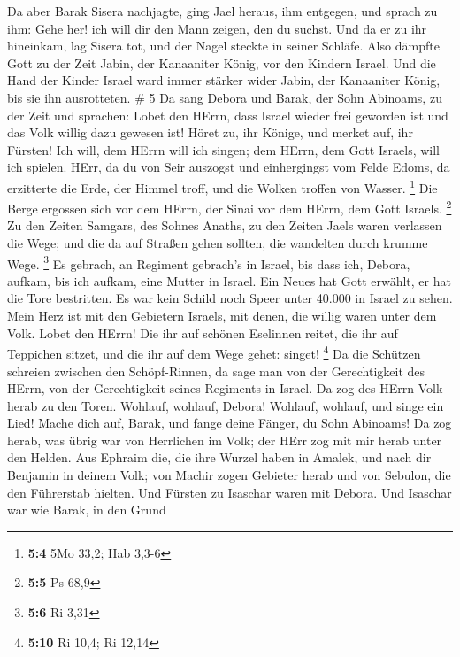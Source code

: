  Da aber Barak Sisera nachjagte, ging Jael heraus, ihm
entgegen, und sprach zu ihm: Gehe her! ich will dir den Mann zeigen, den
du suchst. Und da er zu ihr hineinkam, lag Sisera tot, und der Nagel
steckte in seiner Schläfe.  Also dämpfte Gott zu der Zeit
Jabin, der Kanaaniter König, vor den Kindern Israel.  Und
die Hand der Kinder Israel ward immer stärker wider Jabin, der
Kanaaniter König, bis sie ihn ausrotteten. \# 5  Da sang
Debora und Barak, der Sohn Abinoams, zu der Zeit und sprachen:
 Lobet den HErrn, dass Israel wieder frei geworden ist und
das Volk willig dazu gewesen ist!  Höret zu, ihr Könige, und
merket auf, ihr Fürsten! Ich will, dem HErrn will ich singen; dem HErrn,
dem Gott Israels, will ich spielen.  HErr, da du von Seir
auszogst und einhergingst vom Felde Edoms, da erzitterte die Erde, der
Himmel troff, und die Wolken troffen von Wasser. \footnote{\textbf{5:4}
  5Mo 33,2; Hab 3,3-6}  Die Berge ergossen sich vor dem
HErrn, der Sinai vor dem HErrn, dem Gott Israels. \footnote{\textbf{5:5}
  Ps 68,9}  Zu den Zeiten Samgars, des Sohnes Anaths, zu den
Zeiten Jaels waren verlassen die Wege; und die da auf Straßen gehen
sollten, die wandelten durch krumme Wege. \footnote{\textbf{5:6} Ri 3,31}
 Es gebrach, an Regiment gebrach's in Israel, bis dass ich,
Debora, aufkam, bis ich aufkam, eine Mutter in Israel.  Ein
Neues hat Gott erwählt, er hat die Tore bestritten. Es war kein Schild
noch Speer unter 40.000 in Israel zu sehen.  Mein Herz ist
mit den Gebietern Israels, mit denen, die willig waren unter dem Volk.
Lobet den HErrn!  Die ihr auf schönen Eselinnen reitet, die
ihr auf Teppichen sitzet, und die ihr auf dem Wege gehet: singet!
\footnote{\textbf{5:10} Ri 10,4; Ri 12,14}  Da die Schützen
schreien zwischen den Schöpf-Rinnen, da sage man von der Gerechtigkeit
des HErrn, von der Gerechtigkeit seines Regiments in Israel. Da zog des
HErrn Volk herab zu den Toren.  Wohlauf, wohlauf, Debora!
Wohlauf, wohlauf, und singe ein Lied! Mache dich auf, Barak, und fange
deine Fänger, du Sohn Abinoams!  Da zog herab, was übrig
war von Herrlichen im Volk; der HErr zog mit mir herab unter den Helden.
 Aus Ephraim die, die ihre Wurzel haben in Amalek, und nach
dir Benjamin in deinem Volk; von Machir zogen Gebieter herab und von
Sebulon, die den Führerstab hielten.  Und Fürsten zu
Isaschar waren mit Debora. Und Isaschar war wie Barak, in den Grund
